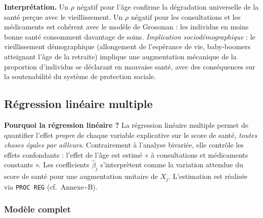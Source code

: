 \documentclass[11pt,a4paper]{memoirerecherche}
\begin{document}
\textbf{Interprétation.} Un \(\rho\) négatif pour l'âge confirme la dégradation universelle de la santé perçue avec le vieillissement. Un \(\rho\) négatif pour les consultations et les médicaments est cohérent avec le modèle de Grossman : les individus en moins bonne santé consomment davantage de soins. \emph{Implication sociodémographique} : le vieillissement démographique (allongement de l'espérance de vie, baby-boomers atteignant l'âge de la retraite) implique une augmentation mécanique de la proportion d'individus se déclarant en mauvaise santé, avec des conséquences sur la soutenabilité du système de protection sociale.

\hypertarget{sec-reglin}{%
\subsection{Régression linéaire multiple}\label{sec-reglin}}

\textbf{Pourquoi la régression linéaire ?} La régression linéaire multiple permet de quantifier l'effet \emph{propre} de chaque variable explicative sur le score de santé, \emph{toutes choses égales par ailleurs}. Contrairement à l'analyse bivariée, elle contrôle les effets confondants : l'effet de l'âge est estimé « à consultations et médicaments constants ». Les coefficients \(\hat{\beta}_j\) s'interprètent comme la variation attendue du score de santé pour une augmentation unitaire de \(X_j\). L'estimation est réalisée via \texttt{PROC\ REG} (cf.~Annexe\textasciitilde B).

\hypertarget{moduxe8le-complet}{%
\subsubsection{Modèle complet}\label{moduxe8le-complet}}
\end{document}
